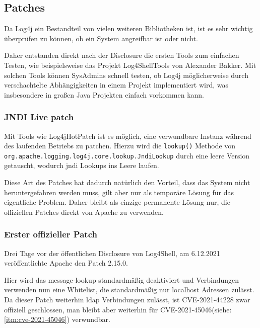 
\subsection{Patches}\label{subsec:patches}
Da Log4j ein Bestandteil von vielen weiteren Bibliotheken ist, ist es sehr wichtig überprüfen zu können, ob ein System angreifbar ist oder nicht.

Daher entstanden direkt nach der Disclosure die ersten Tools zum einfachen Testen, wie beispielsweise das Projekt Log4ShellTools von Alexander Bakker.
Mit solchen Tools können SysAdmins schnell testen, ob Log4j möglicherweise durch verschachtelte Abhängigkeiten in einem Projekt implementiert wird, was insbesondere in großen Java Projekten einfach vorkommen kann.

\subsubsection{JNDI Live patch}
Mit Tools wie Log4jHotPatch ist es möglich, eine verwundbare Instanz während des laufenden Betriebs zu patchen.
Hierzu wird die \verb|lookup()| Methode von \verb|org.apache.logging.log4j.core.lookup.JndiLookup| durch eine leere Version getauscht, wodurch \gls{jndi} Lookups ins Leere laufen.

Diese Art des Patches hat dadurch natürlich den Vorteil, dass das System nicht heruntergefahren werden muss, gilt aber nur als temporäre Lösung für das eigentliche Problem.
Daher bleibt als einzige permanente Lösung nur, die offiziellen Patches direkt von Apache zu verwenden.

\subsubsection{Erster offizieller Patch}
Drei Tage vor der öffentlichen Disclosure von Log4Shell, am 6.12.2021 veröffentlichte Apache den Patch 2.15.0.

Hier wird das message-lookup standardmäßig deaktiviert und  Verbindungen verwenden nun eine Whitelist, die standardmäßig nur localhost Adressen zulässt.
Da dieser Patch weiterhin \gls{ldap} Verbindungen zulässt, ist CVE-2021-44228 zwar offiziell geschlossen, man bleibt aber weiterhin für CVE-2021-45046(siehe: \ref{itm:cve-2021-45046}) verwundbar.

